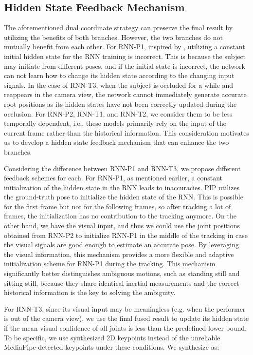 \documentclass[sigconf,nonacm=true]{acmart}
\begin{document}
\subsection{Hidden State Feedback Mechanism}\label{sec:feedback}
The aforementioned dual coordinate strategy can preserve the final result by utilizing the benefits of both branches.
However, the two branches do not mutually benefit from each other.
For RNN-P1, inspired by \cite{PIP},  utilizing a constant initial hidden state for the RNN training is incorrect.
This is because the subject may initiate from different poses, and if the initial state is incorrect, the network can not learn how to change its hidden state according to the changing input signals.
In the case of RNN-T3, when the subject is occluded for a while and reappears in the camera view, the network cannot immediately generate accurate root positions as its hidden states have not been correctly updated during the occlusion.
For RNN-P2, RNN-T1, and RNN-T2, we consider them to be less temporally dependent, i.e., these models primarily rely on the input of the current frame rather than the historical information.
This consideration motivates us to develop a hidden state feedback mechanism that can enhance the two branches.
\par
Considering the difference between RNN-P1 and RNN-T3, we propose different feedback schemes for each.
For RNN-P1, as mentioned earlier, a constant initialization of the hidden state in the RNN leads to inaccuracies.
PIP utilizes the ground-truth pose to initialize the hidden state of the RNN.
This is possible for the first frame but not for the following frames, so after tracking a lot of frames, the initialization has no contribution to the tracking anymore.
On the other hand, we have the visual input, and thus we could use the joint positions  obtained from RNN-P2 to initialize RNN-P1 in the middle of the tracking in case the visual signals are good enough to estimate an accurate pose.
By leveraging the visual information, this mechanism provides a more flexible and adaptive initialization scheme for RNN-P1 during the tracking.
This mechanism significantly better distinguishes ambiguous motions, such as standing still and sitting still, because they share identical inertial measurements and the correct historical information is the key to solving the ambiguity.
\par
For RNN-T3, since its visual input may be meaningless (e.g. when the performer is out of the camera view), we use the final fused result to update its hidden state if the mean visual confidence of all joints  is less than the predefined lower bound.
To be specific, we use synthesized 2D keypoints  instead of the unreliable MediaPipe-detected keypoints under these conditions.
We synthesize  as:
\end{document}
